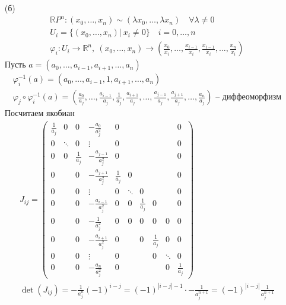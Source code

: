 \begin{enumerate}
\item[(б)]
	\begin{gather*}
		\mathbb{R}P^n: (x_0,\ldots,x_n) \sim (\lambda x_0,\ldots,\lambda x_n)\quad \forall \lambda \ne 0\\
		U_i = \{(x_0, \ldots, x_n)|\ x_i \ne 0\}\quad i = 0,\ldots,n\\
		\varphi_i: U_i \to \mathbb{R}^n,\ (x_0,\ldots,x_n) \to \left(\frac{x_0}{x_i},\ldots,\frac{x_{i-1}}{x_i},\frac{x_{i-1}}{x_i},\ldots,\frac{x_n}{x_i}\right)
	\end{gather*}
	Пусть $a = (a_0,\ldots,a_{i-1},a_{i+1},\ldots,a_n)$
	\begin{gather*}
		\varphi_i^{-1}(a) = (a_0,\ldots,a_{i-1},1,a_{i+1},\ldots,a_n)\\
		\varphi_j \circ \varphi_i^{-1}(a) = \left(\frac{a_0}{a_j},\ldots,\frac{a_{i-1}}{a_j},\frac{1}{a_j},\frac{a_{i+1}}{a_j},\ldots,\frac{a_{j-1}}{a_j},\frac{a_{j+1}}{a_j},\ldots,\frac{a_n}{a_j}\right) \text{ -- диффеоморфизм}
	\end{gather*}
	Посчитаем якобиан
	\begin{gather*}
		J_{ij} =
		\begin{pmatrix}
			\frac{1}{a_j} & 0 & 0 & -\frac{a_0}{a_j^2} & 0 &&&&& 0\\
			0 & \ddots & 0 & \vdots & 0 &&&&& 0\\
			0 & 0 & \frac{1}{a_j} & -\frac{a_{j-1}}{a_j^2} & 0 &&&&& 0\\
			0 && 0 & -\frac{a_{j+1}}{a_j^2} & \frac{1}{a_j} & 0 &&&& 0\\
			0 && 0 & \vdots & 0 & \ddots & 0 &&& 0\\
			0 && 0 & -\frac{a_{i-1}}{a_j^2} & 0 & 0 & \frac{1}{a_j} & 0 && 0\\
			0 && 0 & -\frac{1}{a_j^2} & 0 & 0 & 0 & 0 & 0 & 0\\
			0 && 0 & -\frac{a_{i+1}}{a_j^2} & 0 && 0 & \frac{1}{a_j} & 0 & 0\\
			0 && 0 & \vdots & 0 &&& 0 & \ddots & 0\\
			0 && 0 & -\frac{a_n}{a_j^2} & 0 &&&& 0 & \frac{1}{a_j}
		\end{pmatrix}\\
		\det(J_{ij}) = -\frac{1}{a_j^n} (-1)^{i-j} = (-1)^{|i-j| - 1} \cdot -\frac{1}{a_j^{n+1}} = (-1)^{|i-j|} \frac{1}{a_j^{n+1}}
	\end{gather*}


\end{enumerate}
